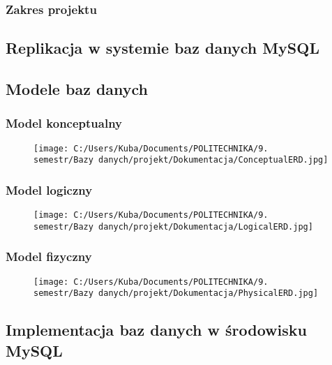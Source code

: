 \documentclass[]{article}
\begin{document}
\hypertarget{header-n13}{%
\subsubsection{Zakres projektu}\label{header-n13}}

\hypertarget{header-n14}{%
\subsection{Replikacja w systemie baz danych MySQL}\label{header-n14}}

\hypertarget{header-n15}{%
\subsection{Modele baz danych}\label{header-n15}}

\hypertarget{header-n16}{%
\subsubsection{Model konceptualny}\label{header-n16}}

\begin{figure}
\centering
\texttt{[image: C:/Users/Kuba/Documents/POLITECHNIKA/9. semestr/Bazy danych/projekt/Dokumentacja/ConceptualERD.jpg]}
\caption{}
\end{figure}

\hypertarget{header-n19}{%
\subsubsection{Model logiczny}\label{header-n19}}

\begin{figure}
\centering
\texttt{[image: C:/Users/Kuba/Documents/POLITECHNIKA/9. semestr/Bazy danych/projekt/Dokumentacja/LogicalERD.jpg]}
\caption{}
\end{figure}

\hypertarget{header-n22}{%
\subsubsection{Model fizyczny}\label{header-n22}}

\begin{figure}
\centering
\texttt{[image: C:/Users/Kuba/Documents/POLITECHNIKA/9. semestr/Bazy danych/projekt/Dokumentacja/PhysicalERD.jpg]}
\caption{}
\end{figure}

\hypertarget{header-n25}{%
\subsection{Implementacja baz danych w środowisku
MySQL}\label{header-n25}}
\end{document}
